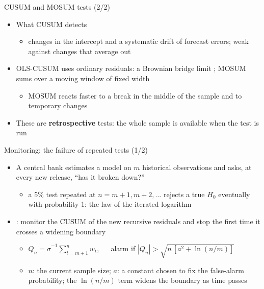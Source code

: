 \begin{frame}{CUSUM and MOSUM tests (2/2)}
\itemsize{\small}
\begin{itemize}
    \item What CUSUM detects
    \begin{itemize}
        \item changes in the intercept and a systematic drift of forecast errors; weak against changes that average out
    \end{itemize}
    \item OLS-CUSUM uses ordinary residuals: a Brownian bridge limit ; MOSUM sums over a moving window of fixed width 
    \begin{itemize}
        \item MOSUM reacts faster to a break in the middle of the sample and to temporary changes
    \end{itemize}
    \item These are \textbf{retrospective} tests: the whole sample is available when the test is run
\end{itemize}
\end{frame}

\begin{frame}{Monitoring: the failure of repeated tests (1/2)}
\itemsize{\small}
\begin{itemize}
    \item A central bank estimates a model on $m$ historical observations and asks, at every new release, ``has it broken down?''
    \begin{itemize}
        \item a 5\% test repeated at $n = m + 1, m + 2, \dots$ rejects a true $H_0$ eventually with probability 1: the law of the iterated logarithm
    \end{itemize}
    \item {}: monitor the CUSUM of the new recursive residuals and stop the first time it crosses a widening boundary
    \begin{itemize}
        \item $Q_n = \hat\sigma^{-1}\sum_{t = m+1}^{n} w_t$, $\quad$ alarm if $|Q_n| > \sqrt{n\,[a^2 + \ln(n/m)]}$
        \item $n$: the current sample size; $a$: a constant chosen to fix the false-alarm probability; the $\ln(n/m)$ term widens the boundary as time passes
    \end{itemize}
\end{itemize}
\end{frame}

